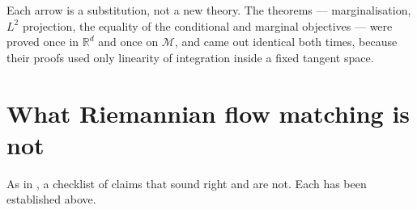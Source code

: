 \documentclass[11pt,a4paper]{report}
\theoremstyle{definition}
\theoremstyle{remark}
\newcommand{\RR}{\mathbb R}
\begin{document}
Each arrow is a substitution, not a new theory. The theorems --- marginalisation,
$L^2$ projection, the equality of the conditional and marginal objectives ---
were proved once in $\RR^d$ and once on $\mathcal M$, and came out identical
both times, because their proofs used only linearity of integration inside a
fixed tangent space.

\section{What Riemannian flow matching is not}
\label{sec:rfm-misconceptions}

As in , a checklist of claims that sound right
and are not. Each has been established above.
\end{document}
